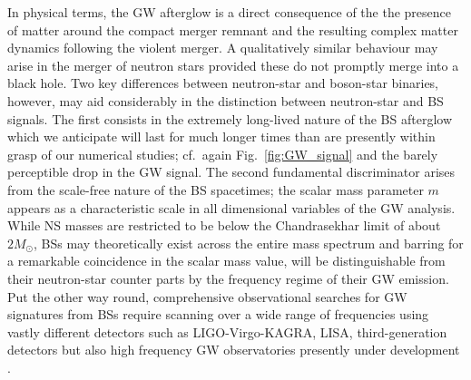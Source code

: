 \documentclass[aps,twocolumn,nofootinbib,superscriptaddress,amsfonts,floatfix
]{revtex4-1} %
\begin{document}
In physical terms, the GW afterglow is a direct consequence
of the the presence of matter around the compact merger remnant
and the resulting complex matter dynamics following the violent
merger. A qualitatively similar behaviour may arise in the
merger of neutron stars provided these do not promptly merge
into a black hole. Two key differences between neutron-star
and boson-star binaries, however, may aid considerably in the
distinction between neutron-star and BS
signals. The first consists in the
extremely long-lived nature of the BS afterglow which we
anticipate will last for much longer times than are presently
within grasp of our numerical studies; cf.~again Fig.~\ref{fig:GW_signal} and the barely perceptible
drop in the GW signal. The second fundamental discriminator
arises from the scale-free nature of the BS spacetimes;
the scalar mass parameter $m$ appears as a characteristic
scale in all dimensional variables of the GW analysis.
While NS masses are restricted to be below the Chandrasekhar limit of about $2 M_{\odot}$, BSs may theoretically exist
across the entire mass spectrum and barring for a remarkable
coincidence in the scalar mass value, will be distinguishable
from their neutron-star counter parts by the frequency regime
of their GW emission. Put the other way round, comprehensive
observational searches for GW signatures from BSs require
scanning over a wide range of frequencies using vastly
different detectors such as LIGO-Virgo-KAGRA, LISA,
third-generation detectors but also high frequency GW observatories presently under development \cite{Aggarwal:2020olq,Badurina:2019hst}.
\end{document}

